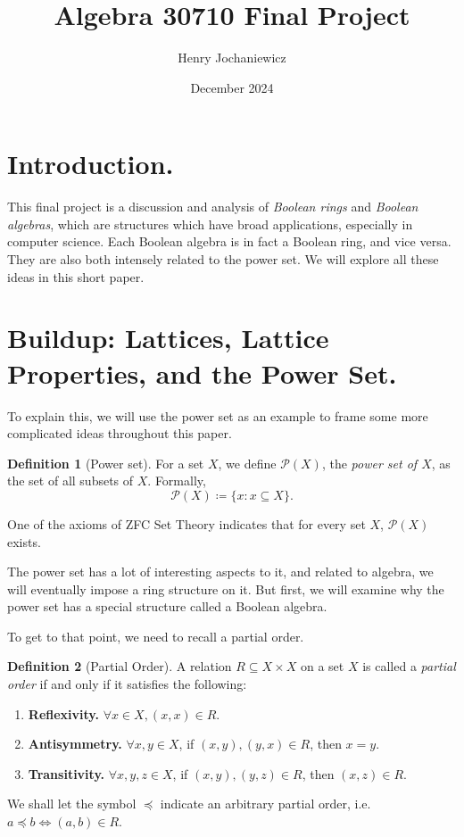 \documentclass[10pt, letterpaper]{article}
\title{Algebra 30710 Final Project}
\author{Henry Jochaniewicz}
\date{December 2024}
\newcommand{\buildset}[2]{\{#1:#2\}}
\newcommand{\powerset}[1]{\mathcal{P}(#1)}
\theoremstyle{definition}
\newtheorem{definition}{Definition}[section]
\begin{document}
\maketitle

\section{Introduction.}

This final project is a discussion and analysis of 
\textit{Boolean rings} and \textit{Boolean algebras}, 
which are structures which have broad applications, especially in computer science.
Each Boolean algebra is in fact a Boolean ring, and vice versa.
They are also both intensely related to the power set.
We will explore all these ideas in this short paper.

\section{Buildup: Lattices, Lattice Properties, and the Power Set.}

To explain this, we will use the power set as an example
to frame some more complicated ideas throughout this paper.

\begin{definition}[Power set]
	For a set \(X\), we define \(\powerset{X}\), the \textit{power set of \(X\)},
	as the set of all subsets of \(X\).
	Formally, \[\powerset{X}\coloneqq \buildset{x}{x\subseteq X}.\]
\end{definition}

One of the axioms of ZFC Set Theory indicates that for every set \(X\), \(\powerset{X}\) exists.

The power set has a lot of interesting aspects to it, and related to algebra, 
we will eventually impose a ring structure on it. 
But first, we will examine why the power set has a special structure called a Boolean algebra.

To get to that point, we need to recall a partial order.

\begin{definition}[Partial Order]
	A relation \(R\subseteq X\times X\) on a set $X$ is called a \textit{partial order} if and only if it satisfies the following:
	\begin{enumerate}
		\item \textbf{Reflexivity.} \(\forall x\in X, (x,x)\in R\).
		\item \textbf{Antisymmetry.} \(\forall x,y\in X\), if \((x,y), (y,x)\in R\), then $x=y$.
		\item \textbf{Transitivity.} \(\forall x,y,z\in X\), if \((x,y), (y,z)\in R\), 
			then \((x,z)\in R\).
	\end{enumerate}

	We shall let the symbol \(\preceq\) indicate an arbitrary partial order, 
	i.e. \(a\preceq b \iff (a,b)\in R\).
\end{definition}
\end{document}
